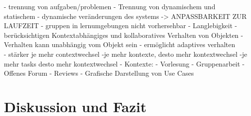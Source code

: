 \documentclass[conference]{IEEEtran}
\begin{document}
- trennung von aufgaben/problemen
- Trennung von dynamischem und statischem
- dynamische veränderungen des systems -> ANPASSBARKEIT ZUR LAUFZEIT
	- gruppen in lernumgebungen nicht vorhersehbar
- Langlebigkeit
- berücksichtigen Kontextabhängiges und kollaboratives Verhalten von Objekten \cite{family}
- Verhalten kann unabhängig vom Objekt sein - ermöglicht adaptives verhalten\\
- stärker je mehr contextwechsel
	-je mehr kontexte, desto mehr kontextwechsel
		-je mehr tasks desto mehr kontextwechsel
- Kontexte:
	- Vorlesung
	- Gruppenarbeit
	- Offenes Forum
	- Reviews
- Grafische Darstellung von Use Cases




\section{Diskussion und Fazit}

{}



\end{document}
